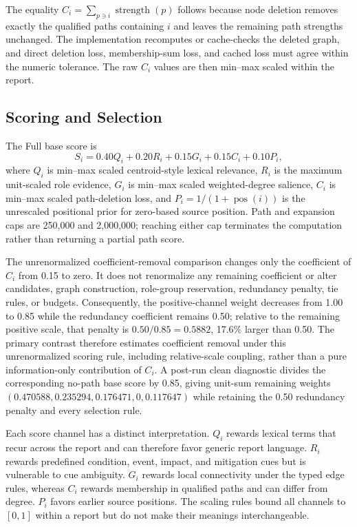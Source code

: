 \documentclass[applsci,article,submit,moreauthors]{Definitions/mdpi}
\begin{document}
The equality $C_i=\sum_{p\ni i}\operatorname{strength}(p)$ follows because node deletion removes exactly the qualified paths containing $i$ and leaves the remaining path strengths unchanged. The implementation recomputes or cache-checks the deleted graph, and direct deletion loss, membership-sum loss, and cached loss must agree within the numeric tolerance. The raw $C_i$ values are then min--max scaled within the report.

\subsection{Scoring and Selection}

The Full base score is
\begin{equation}
S_i=0.40Q_i+0.20R_i+0.15G_i+0.15C_i+0.10P_i,
\end{equation}
where $Q_i$ is min--max scaled centroid-style lexical relevance, $R_i$ is the maximum unit-scaled role evidence, $G_i$ is min--max scaled weighted-degree salience, $C_i$ is min--max scaled path-deletion loss, and $P_i=1/(1+\operatorname{pos}(i))$ is the unrescaled positional prior for zero-based source position. Path and expansion caps are 250,000 and 2,000,000; reaching either cap terminates the computation rather than returning a partial path score.

The unrenormalized coefficient-removal comparison changes only the coefficient of $C_i$ from 0.15 to zero. It does not renormalize any remaining coefficient or alter candidates, graph construction, role-group reservation, redundancy penalty, tie rules, or budgets. Consequently, the positive-channel weight decreases from 1.00 to 0.85 while the redundancy coefficient remains 0.50; relative to the remaining positive scale, that penalty is $0.50/0.85=0.5882$, 17.6\% larger than 0.50. The primary contrast therefore estimates coefficient removal under this unrenormalized scoring rule, including relative-scale coupling, rather than a pure information-only contribution of $C_i$. A post-run clean diagnostic divides the corresponding no-path base score by 0.85, giving unit-sum remaining weights $(0.470588,0.235294,0.176471,0,0.117647)$ while retaining the 0.50 redundancy penalty and every selection rule.

Each score channel has a distinct interpretation. $Q_i$ rewards lexical terms that recur across the report and can therefore favor generic report language. $R_i$ rewards predefined condition, event, impact, and mitigation cues but is vulnerable to cue ambiguity. $G_i$ rewards local connectivity under the typed edge rules, whereas $C_i$ rewards membership in qualified paths and can differ from degree. $P_i$ favors earlier source positions. The scaling rules bound all channels to $[0,1]$ within a report but do not make their meanings interchangeable.
\end{document}
